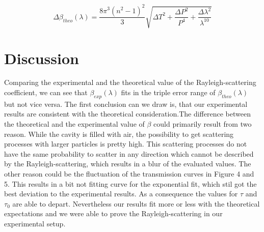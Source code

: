\documentclass[10pt,a4paper]{article}
\begin{document}
\begin{equation}
\Delta \beta_{theo} (\lambda) = \frac{8\pi ^{3}(n^{2}-1)^{2}}{3}\sqrt{\Delta T^{2} + \frac{\Delta P^{2}}{P^{4}}+ \frac{\Delta \lambda^{2}}{\lambda^{10}}}
\end{equation}

\section{Discussion}

Comparing the experimental and the theoretical value of the Rayleigh-scattering coefficient, we can see that $\beta_{exp}(\lambda)$ fits in the triple error range of $\beta_{theo}(\lambda)$ but not vice versa. The first conclusion can we draw is, that our experimental results are consistent with the theoretical consideration.The difference between the theoretical and the experimental value of $ \beta$ could primarily result from two reason.
While the cavity is filled with air, the possibility to get scattering processes with larger particles is pretty high. This scattering processes do not have the same probability to scatter in any direction which cannot be described by the Rayleigh-scattering, which results in a blur of the evaluated values. The other reason could be the fluctuation of the transmission curves in Figure 4 and 5. This results in a bit not fitting curve for the exponential fit, which stil got the best deviation to the experimental results. As a consequence the values for $\tau$ and $\tau_{0}$ are able to depart. 
Nevertheless our results fit more or less with the theoretical expectations and we were able to prove the Rayleigh-scattering in our experimental setup.
\end{document}
